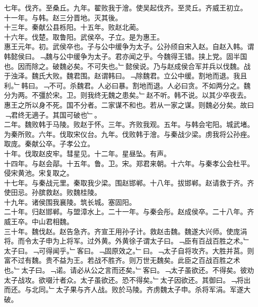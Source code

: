 \documentclass{zhvt-classic}
\begin{document}
\hspace*{2em}七年。伐齐。至桑丘。九年。翟败我于澮。使吴起伐齐。至灵丘。齐威王初立。\\
\hspace*{2em}十一年。与韩。赵三分晋地。灭其後。\\
\hspace*{2em}十三年。秦献公县栎阳。十五年。败赵北蔺。\\
\hspace*{2em}十六年。伐楚。取鲁阳。武侯卒。子立。是为惠王。\\
\hspace*{2em}惠王元年。初。武侯卒也。子与公中缓争为太子。公孙颀自宋入赵。自赵入韩。谓韩懿侯曰。﹁魏与公中缓争为太子。君亦闻之乎。今魏得王错。挟上党。固半国也。因而除之。破魏必矣。不可失也。﹂懿侯说。乃与赵成侯合军并兵以伐魏。战于浊泽。魏氏大败。魏君围。赵谓韩曰。﹁除魏君。立公中缓。割地而退。我且利。﹂韩曰。﹁不可。杀魏君。人必曰暴。割地而退。人必曰贪。不如两分之。魏分为两。不彊於宋。卫。则我终无魏之患矣。﹂赵不听。韩不说。以其少卒夜去。惠王之所以身不死。国不分者。二家谋不和也。若从一家之谋。则魏必分矣。故曰﹁君终无適子。其国可破也﹂。\\
\hspace*{2em}二年。魏败韩于马陵。败赵于怀。三年。齐败我观。五年。与韩会宅阳。城武堵。为秦所败。六年。伐取宋仪台。九年。伐败韩于澮。与秦战少梁。虏我将公孙痤。取庞。秦献公卒。子孝公立。\\
\hspace*{2em}十年。伐取赵皮牢。彗星见。十二年。星昼坠。有声。\\
\hspace*{2em}十四年。与赵会鄗。十五年。鲁。卫。宋。郑君来朝。十六年。与秦孝公会杜平。侵宋黄池。宋复取之。\\
\hspace*{2em}十七年。与秦战元里。秦取我少梁。围赵邯郸。十八年。拔邯郸。赵请救于齐。齐使田忌。孙膑救赵。败魏桂陵。\\
\hspace*{2em}十九年。诸侯围我襄陵。筑长城。塞固阳。\\
\hspace*{2em}二十年。归赵邯郸。与盟漳水上。二十一年。与秦会彤。赵成侯卒。二十八年。齐威王卒。中山君相魏。\\
\hspace*{2em}三十年。魏伐赵。赵告急齐。齐宣王用孙子计。救赵击魏。魏遂大兴师。使庞涓将。而令太子申为上将军。过外黄。外黄徐子谓太子曰。﹁臣有百战百胜之术。﹂太子曰。﹁可得闻乎。﹂客曰。﹁固原效之。﹂曰。﹁太子自将攻齐。大胜并莒。则富不过有魏。贵不益为王。若战不胜齐。则万世无魏矣。此臣之百战百胜之术也。﹂太子曰。﹁诺。请必从公之言而还矣。﹂客曰。﹁太子虽欲还。不得矣。彼劝太子战攻。欲啜汁者众。太子虽欲还。恐不得矣。﹂太子因欲还。其御曰。﹁将出而还。与北同。﹂太子果与齐人战。败於马陵。齐虏魏太子申。杀将军涓。军遂大破。\\
\end{document}
